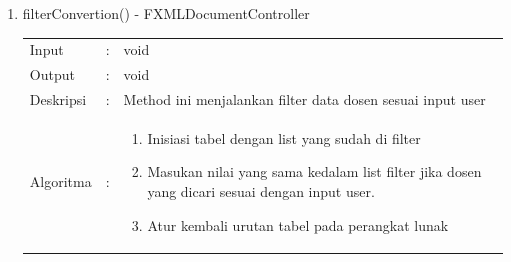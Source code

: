 \begin{enumerate}
	\item filterConvertion() - FXMLDocumentController\\
	\begin{tabular}{l c p{9cm}}
		Input & : & void\\ 
		Output & : & void \\ 
		Deskripsi & : & Method ini menjalankan filter data dosen sesuai input user\\
		Algoritma & : & 
			\begin{enumerate}
				\item Inisiasi tabel dengan list yang sudah di filter
				\item Masukan nilai yang sama kedalam list filter jika dosen yang dicari sesuai dengan input user.
				\item Atur kembali urutan tabel pada perangkat lunak
			\end{enumerate}
		\end{tabular}	
\end{enumerate}
